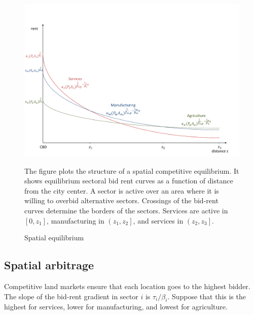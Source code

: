 \documentclass[12pt]{article}
\begin{document}
\begin{figure}[h!]
\label{fig:BidRent}
\caption{Spatial equilibrium}
\begin{center}
\includegraphics[scale=0.6]{figures/fig_spatial_equilibrium}
\end{center}

\noindent \footnotesize{The figure plots the structure of a spatial competitive equilibrium. It shows equilibrium sectoral bid rent curves as a function of distance from the city center. A sector is active over an area where it is willing to overbid alternative sectors. Crossings of the bid-rent curves determine the borders of the sectors. Services are active in $[0,z_1]$, manufacturing in $\left(z_1,z_2\right]$, and services in $\left(z_2,z_3\right]$.}
\end{figure}


\subsection{Spatial arbitrage}
Competitive land markets ensure that each location goes to the highest bidder. The slope of the bid-rent gradient in sector $i$ is $\tau_i/\beta_i$. Suppose that this is the highest for services, lower for manufacturing, and lowest for agriculture.
\end{document}

